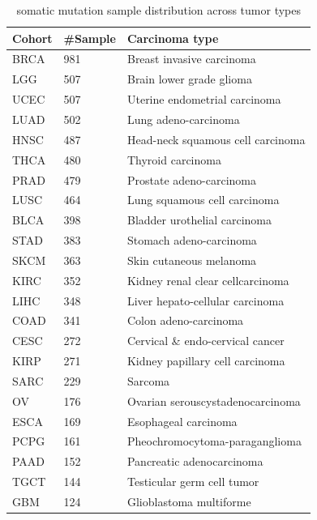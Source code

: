 \begin{table} [!ht] 
    \begin{center}
    \scriptsize
    \caption{somatic mutation sample distribution across tumor types}
        \vspace{-2mm}
    \label{table:SM_dist}
    \begin{tabular}{l|l|l}
        \toprule
         \textbf{Cohort} & \textbf{\#Sample} & \textbf{Carcinoma type} \\\midrule
         BRCA & 981  & Breast invasive carcinoma  \\%
         LGG  & 507  & Brain lower grade glioma \\%
         UCEC & 507  & Uterine endometrial carcinoma \\%
         LUAD & 502  & Lung adeno-carcinoma \\%
         HNSC & 487  & Head-neck squamous cell carcinoma \\%
         THCA & 480  & Thyroid carcinoma \\%
         PRAD & 479  & Prostate adeno-carcinoma \\%
         LUSC & 464  & Lung squamous cell carcinoma \\%
         BLCA & 398  & Bladder urothelial carcinoma \\%
         STAD & 383  & Stomach adeno-carcinoma \\%
         SKCM & 363  & Skin cutaneous melanoma \\%
         KIRC & 352  & Kidney renal clear cellcarcinoma  \\%
         LIHC & 348  & Liver hepato-cellular carcinoma	\\%
         COAD & 341  & Colon adeno-carcinoma \\%
         CESC & 272  & Cervical \& endo-cervical cancer \\%
         KIRP & 271  & Kidney papillary cell carcinoma	\\%
         SARC & 229  & Sarcoma \\%
         OV   & 176  & Ovarian serouscystadenocarcinoma \\%
         ESCA & 169  & Esophageal carcinoma \\%
         PCPG & 161  & Pheochromocytoma-paraganglioma \\%
         PAAD & 152  & Pancreatic adenocarcinoma	\\%
         TGCT & 144  & Testicular germ cell tumor \\%
         GBM  & 124  & Glioblastoma multiforme \\%

\end{tabular}
\end{center}
\end{table}

